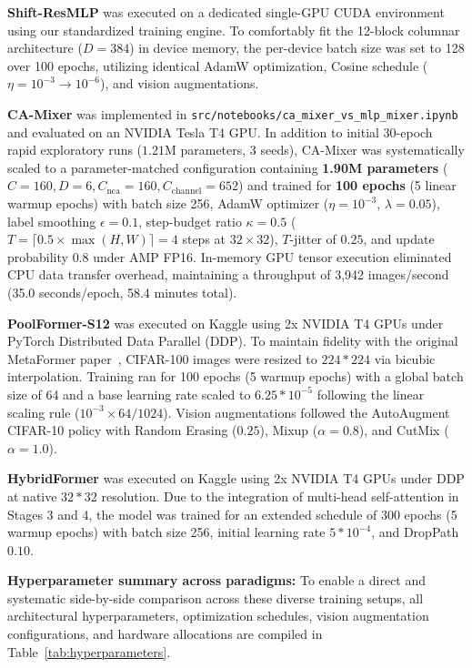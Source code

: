 \textbf{Shift-ResMLP} was executed on a dedicated single-GPU CUDA environment using our standardized training engine. To comfortably fit the 12-block columnar architecture ($D=384$) in device memory, the per-device batch size was set to 128 over 100 epochs, utilizing identical AdamW optimization, Cosine schedule ($\eta = 10^{-3} \rightarrow 10^{-6}$), and vision augmentations.

\textbf{CA-Mixer} was implemented in \texttt{src/notebooks/ca\_mixer\_vs\_mlp\_mixer.ipynb} and evaluated on an NVIDIA Tesla T4 GPU. In addition to initial 30-epoch rapid exploratory runs ($1.21$M parameters, 3 seeds), CA-Mixer was systematically scaled to a parameter-matched configuration containing \textbf{1.90M parameters} ($C=160, D=6, C_{\text{nca}}=160, C_{\text{channel}}=652$) and trained for \textbf{100 epochs} (5 linear warmup epochs) with batch size 256, AdamW optimizer ($\eta = 10^{-3}$, $\lambda=0.05$), label smoothing $\epsilon=0.1$, step-budget ratio $\kappa=0.5$ ($T = \lceil 0.5 \times \max(H, W) \rceil = 4$ steps at $32\times32$), $T$-jitter of $0.25$, and update probability $0.8$ under AMP FP16. In-memory GPU tensor execution eliminated CPU data transfer overhead, maintaining a throughput of 3,942 images/second (35.0 seconds/epoch, 58.4 minutes total).

\textbf{PoolFormer-S12} was executed on Kaggle using 2x NVIDIA T4 GPUs under PyTorch Distributed Data Parallel (DDP). To maintain fidelity with the original MetaFormer paper~\cite{yu2022metaformer}, CIFAR-100 images were resized to $224*224$ via bicubic interpolation. Training ran for 100 epochs (5 warmup epochs) with a global batch size of 64 and a base learning rate scaled to $6.25*10^{-5}$ following the linear scaling rule ($10^{-3} \times 64 / 1024$). Vision augmentations followed the AutoAugment CIFAR-10 policy with Random Erasing ($0.25$), Mixup ($\alpha=0.8$), and CutMix ($\alpha=1.0$).

\textbf{HybridFormer} was executed on Kaggle using 2x NVIDIA T4 GPUs under DDP at native $32*32$ resolution. Due to the integration of multi-head self-attention in Stages 3 and 4, the model was trained for an extended schedule of 300 epochs (5 warmup epochs) with batch size 256, initial learning rate $5*10^{-4}$, and DropPath $0.10$.

\textbf{Hyperparameter summary across paradigms:} To enable a direct and systematic side-by-side comparison across these diverse training setups, all architectural hyperparameters, optimization schedules, vision augmentation configurations, and hardware allocations are compiled in Table~\ref{tab:hyperparameters}.

